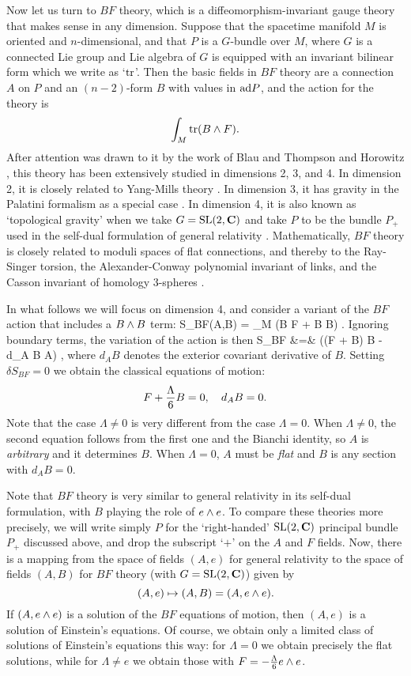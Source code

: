 Now let us turn to $BF$ theory, which is a
diffeomorphism-invariant gauge theory that makes sense in any
dimension.   Suppose that the spacetime manifold $M$ is oriented
and  $n$-dimensional, and that $P$ is a $G$-bundle over $M$, where $G$
is a connected Lie group and
Lie algebra of $G$ is equipped with an invariant
bilinear form which we write as `${\rm tr}$'.   Then the basic fields in
$BF$ theory are a connection $A$ on $P$ and an $(n-2)$-form $B$
with values in ${\rm ad} P$, and the action for the theory is
\[       \int_M {\rm tr}(B \wedge F)  .\]
After attention was drawn to it by the work of Blau and Thompson
\cite{BT1} and Horowitz \cite{Horowitz}, this theory has been
extensively studied in dimensions 2, 3, and 4.  In dimension 2, it is
closely related to Yang-Mills theory \cite{Witten3}.  In dimension 3, it
has gravity in the Palatini formalism as a special case
\cite{AHRSS,Witten1}.  In dimension 4, it is also known as `topological
gravity' when we take $G = {\rm SL}(2,{\bf C})$ and take $P$ to be the bundle
$P_+$ used in the self-dual formulation of general relativity
\cite{CM,CS}.  Mathematically, $BF$ theory is closely related to moduli
spaces of flat connections, and thereby to the Ray-Singer torsion, the
Alexander-Conway polynomial invariant of links, and the Casson invariant
of homology 3-spheres \cite{BBRT,BT1,CCM,Schwartz}.

In what follows we will focus on dimension 4, and consider
a variant of the $BF$ action that includes a $B \wedge B$ term:
\be   S_{BF}(A,B)  = \int_M \tr (B \we F + {\Lambda {}} B \we B) .
\label{BFaction} \ee
Ignoring boundary terms, the variation of the action is then
\ban     \delta S_{BF}
&=&
\int \tr ((F + {\Lambda {}} B) \we \delta B - d_A B \we \delta A) ,
\ean
where $d_A B$ denotes the
exterior covariant derivative of $B$.  Setting $\delta S_{BF} = 0$
we obtain the classical equations of motion:
\[         F + {\Lambda\over 6} B = 0, \quad d_A B= 0 .\]
Note that the case $\Lambda \ne 0$ is very different from the case
$\Lambda = 0$.  When $\Lambda \ne 0$, the second equation follows from
the first one and the Bianchi identity, so $A$ is {\it arbitrary} and it
determines $B$.  When $\Lambda = 0$, $A$ must be {\it flat} and $B$ is
any section with $d_A B = 0$.

Note that $BF$ theory is very similar to general relativity in its
self-dual formulation, with $B$ playing the role of $e \wedge e$.  To
compare these theories more precisely, we will write simply $P$ for the
`right-handed' ${\rm SL}(2,{\bf C})$ principal bundle $P_+$ discussed above, and
drop the subscript `$+$' on the $A$ and $F$ fields.  Now, there is a
mapping from the space of fields $(A,e)$ for general relativity to the
space of fields $(A,B)$ for $BF$ theory (with $G = {\rm SL}(2,{\bf C})$) given by
\[          (A,e) \mapsto (A,B) = (A,e \wedge e) .\]
If $(A,e\wedge e)$ is a solution of the $BF$ equations of motion, then
$(A,e)$ is a solution of Einstein's equations.  Of course, we obtain
only a limited class of solutions of Einstein's equations this way: for
$\Lambda = 0$ we obtain precisely the flat solutions, while for $\Lambda
\ne e$ we obtain those with $F = -{\Lambda \over 6} e \wedge e$.

